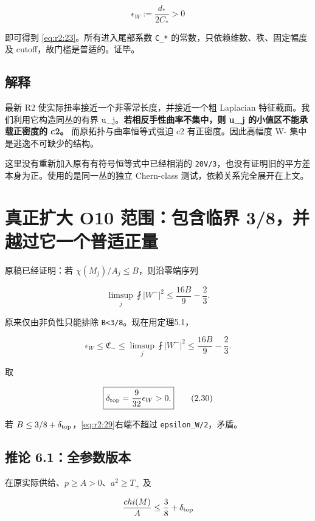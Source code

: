 \documentclass[UTF8,11pt,openany,oneside,fontset=none]{ctexbook}
\begin{document}
\[
 \epsilon_W:=\frac{d_*}{2C_*}>0
\]

即可得到 \eqref{eq:r2:23}。所有进入尾部系数 \texttt{C\_*} 的常数，只依赖维数、秩、固定幅度及 cutoff，故门槛是普适的。证毕。

\subsection{解释}\label{ch2:ux89e3ux91ca}

最新 R2 使实际扭率接近一个非零常长度，并接近一个粗 Laplacian 特征截面。我们利用它构造同丛的有界 u\_j。\textbf{若相反手性曲率不集中，则 u\_j 的小值区不能承载正密度的 c2。} 而原拓扑与曲率恒等式强迫 c2 有正密度。因此高幅度 W- 集中是逃逸不可缺少的结构。

这里没有重新加入原有有符号恒等式中已经相消的 \texttt{20V/3}，也没有证明旧的平方差本身为正。使用的是同一丛的独立 Chern-class 测试，依赖关系完全展开在上文。

\section{真正扩大 O10 范围：包含临界 3/8，并越过它一个普适正量}\label{ch2:ux771fux6b63ux6269ux5927-o10-ux8303ux56f4ux5305ux542bux4e34ux754c-38ux5e76ux8d8aux8fc7ux5b83ux4e00ux4e2aux666eux9002ux6b63ux91cf}

原稿已经证明：若 \(\chi(M_j)/A_j\le B\)，则沿零端序列

\[
 \limsup_j\fint|W^-|^2\le\frac{16B}{9}-\frac23.
 \tag{2.28}\label{eq:r2:28}
\]

原来仅由非负性只能排除 \texttt{B\textless{}3/8}。现在用定理5.1，

\[
 \epsilon_W\le\mathfrak C_-
 \le\limsup_j\fint|W^-|^2
 \le\frac{16B}{9}-\frac23.
 \tag{2.29}\label{eq:r2:29}
\]

取

\[
 \boxed{\delta_{\rm top}=\frac9{32}\epsilon_W>0.}
 \tag{2.30}\label{eq:r2:30}
\]

若 \(B\le3/8+\delta_{\rm top}\)，\eqref{eq:r2:29}右端不超过 \texttt{epsilon\_W/2}，矛盾。

\subsection{推论 6.1：全参数版本}\label{ch2:ux63a8ux8bba-6.1ux5168ux53c2ux6570ux7248ux672c}

在原实际供给、\(p\ge A>0\)、\(a^2\ge T_+\) 及

\[
 \frac{\chi(M)}A\le\frac38+\delta_{\rm top}
\]
\end{document}
